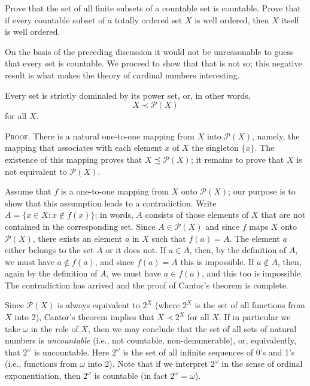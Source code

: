 \begin{exercise} Prove that the set of all finite subsets of a countable set is countable. Prove that if every countable subset of a totally ordered set $X$ is well ordered, then $X$ itself is well ordered. 
\end{exercise}

On the basis of the preceding discussion it would not be unreasonable to guess that every set is countable. We proceed to show that that is not so; this negative result is what makes the theory of cardinal numbers interesting.

\newpage

\begin{samepage}
\begin{named} Every set is strictly dominaled by its power set, or, in other words, 
\begin{equation*}
X \prec \mathcal{P}(X)
\end{equation*}
for all $X$. 
\end{named}
\end{samepage}

\textsc{Proof}. There is a natural one-to-one mapping from $X$ into $\mathcal{P}(X)$, namely, the mapping that associates with each element $x$ of $X$ the singleton $\{ x \}$. The existence of this mapping proves that $X \precsim \mathcal{P}(X)$; it remains to prove that $X$ is not equivalent to $\mathcal{P}(X)$. 

Assume that $f$ is a one-to-one mapping from $X$ onto $\mathcal{P}(X)$; our purpose is to show that this assumption  leads to a contradiction. Write $A = \{ x \in X: x \notin f(x) \}$; in words, $A$ consists of those elements of $X$ that are not contained in the corresponding set. Since $A \in \mathcal{P}(X)$ and since $f$ maps $X$ onto $\mathcal{P}(X)$, there exists an element $a$ in $X$ such that $f(a) = A$. The element $a$ either belongs to the set $A$ or it does not. If $a \in A$, then, by the definition of $A$, we must have $a \notin f(a)$, and since $f(a) = A$ this is impossible. If $a \notin A$, then, again by the definition of $A$, we must have $a \in f(a)$, and this too is impossible. The contradiction has arrived and the proof of Cantor's theorem is complete.

Since $\mathcal{P}(X)$ is always equivalent to $2^{X}$ (where $2^{X}$ is the set of all functions from $X$ into 2), Cantor's theorem implies that $X \prec 2^{X}$ for all $X$. If in particular we take $\omega$ in the role of $X$, then we may conclude that the set of all sets of natural numbers is \textit{uncountable} (i.e., not countable, non-denumerable), or, equivalently, that $2^{\omega}$ is uncountable. Here $2^{\omega}$ is the set of all infinite sequences of 0's and 1's (i.e., functions from $\omega$ into 2). Note that if we interpret $2^{\omega}$ in the sense of ordinal exponentiation, then $2^{\omega}$ is countable (in fact $2^{\omega} = \omega$).